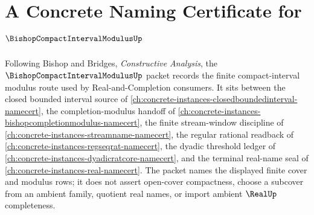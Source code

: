 \chapter{A Concrete Naming Certificate for $\BishopCompactIntervalModulusUp$}
\label{ch:concrete-instances-bishop-compact-interval-modulus-namecert}

Following Bishop and Bridges, \emph{Constructive Analysis}, the $\BishopCompactIntervalModulusUp$ packet records the finite compact-interval modulus route used by Real-and-Completion consumers. It sits between the closed bounded interval source of \autoref{ch:concrete-instances-closedboundedinterval-namecert}, the completion-modulus handoff of \autoref{ch:concrete-instances-bishopcompletionmodulus-namecert}, the finite stream-window discipline of \autoref{ch:concrete-instances-streamname-namecert}, the regular rational readback of \autoref{ch:concrete-instances-regseqrat-namecert}, the dyadic threshold ledger of \autoref{ch:concrete-instances-dyadicratcore-namecert}, and the terminal real-name seal of \autoref{ch:concrete-instances-real-namecert}. The packet names the displayed finite cover and modulus rows; it does not assert open-cover compactness, choose a subcover from an ambient family, quotient real names, or import ambient $\RealUp$ completeness.

